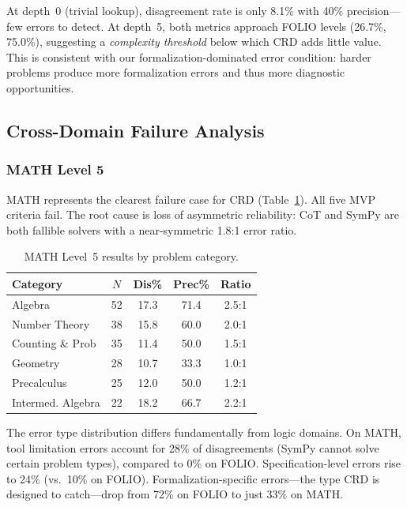 \documentclass[11pt,a4paper]{article}
\begin{document}
At depth~0 (trivial lookup), disagreement rate is only 8.1\% with 40\% precision---few errors to detect. At depth~5, both metrics approach FOLIO levels (26.7\%, 75.0\%), suggesting a \textit{complexity threshold} below which CRD adds little value. This is consistent with our formalization-dominated error condition: harder problems produce more formalization errors and thus more diagnostic opportunities.

\subsection{Cross-Domain Failure Analysis}
\label{sec:cross_domain}

\subsubsection{MATH Level 5}

MATH represents the clearest failure case for CRD (Table~\ref{tab:math_main}). All five MVP criteria fail. The root cause is loss of asymmetric reliability: CoT and SymPy are both fallible solvers with a near-symmetric 1.8:1 error ratio.

\begin{table}[t]
\centering
\small
\caption{MATH Level~5 results by problem category.}
\label{tab:math_main}
\begin{tabular}{lcccc}
\toprule
\textbf{Category} & $N$ & \textbf{Dis\%} & \textbf{Prec\%} & \textbf{Ratio} \\
\midrule
Algebra & 52 & 17.3 & 71.4 & 2.5:1 \\
Number Theory & 38 & 15.8 & 60.0 & 2.0:1 \\
Counting \& Prob & 35 & 11.4 & 50.0 & 1.5:1 \\
Geometry & 28 & 10.7 & 33.3 & 1.0:1 \\
Precalculus & 25 & 12.0 & 50.0 & 1.2:1 \\
Intermed. Algebra & 22 & 18.2 & 66.7 & 2.2:1 \\
\bottomrule
\end{tabular}
\end{table}

The error type distribution differs fundamentally from logic domains. On MATH, tool limitation errors account for 28\% of disagreements (SymPy cannot solve certain problem types), compared to 0\% on FOLIO. Specification-level errors rise to 24\% (vs.\ 10\% on FOLIO). Formalization-specific errors---the type CRD is designed to catch---drop from 72\% on FOLIO to just 33\% on MATH.
\end{document}
